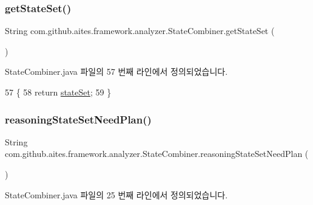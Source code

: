 \subsubsection{\texorpdfstring{get\+State\+Set()}{getStateSet()}}
{\footnotesize\ttfamily String com.\+github.\+aites.\+framework.\+analyzer.\+State\+Combiner.\+get\+State\+Set (\begin{DoxyParamCaption}{ }\end{DoxyParamCaption})}



State\+Combiner.\+java 파일의 57 번째 라인에서 정의되었습니다.


\begin{DoxyCode}
57                                \{
58         \textcolor{keywordflow}{return} \mbox{\hyperlink{classcom_1_1github_1_1aites_1_1framework_1_1analyzer_1_1_state_combiner_a22e4dfec53b75aec655f02328f96f4c0}{stateSet}};
59     \}
\end{DoxyCode}
\mbox{\label{classcom_1_1github_1_1aites_1_1framework_1_1analyzer_1_1_state_combiner_aec95bd50fb6b328eaa10f37021cbfc48}} 
\subsubsection{\texorpdfstring{reasoning\+State\+Set\+Need\+Plan()}{reasoningStateSetNeedPlan()}}
{\footnotesize\ttfamily String com.\+github.\+aites.\+framework.\+analyzer.\+State\+Combiner.\+reasoning\+State\+Set\+Need\+Plan (\begin{DoxyParamCaption}{ }\end{DoxyParamCaption})}



State\+Combiner.\+java 파일의 25 번째 라인에서 정의되었습니다.



